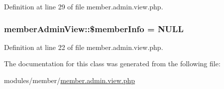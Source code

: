 Definition at line 29 of file member.\+admin.\+view.\+php.

\hypertarget{classmemberAdminView_a4955a7b9bc128c344a2987dd1cb8e043}{
\subsubsection[{\$member\+Info}]{\setlength{\rightskip}{0pt plus 5cm}member\+Admin\+View\+::\$member\+Info = N\+U\+L\+L}}\label{classmemberAdminView_a4955a7b9bc128c344a2987dd1cb8e043}


Definition at line 22 of file member.\+admin.\+view.\+php.



The documentation for this class was generated from the following file\+:\begin{DoxyCompactItemize}
\item 
modules/member/\hyperlink{member_8admin_8view_8php}{member.\+admin.\+view.\+php}\end{DoxyCompactItemize}
